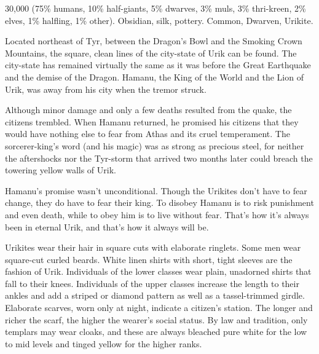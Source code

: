 {30,000 (75\% humans, 10\% half-giants, 5\% dwarves, 3\% muls, 3\% thri-kreen, 2\% elves, 1\% halfling, 1\% other).}
{Obsidian, silk, pottery.}
{Common, Dwarven, Urikite.}
{
	Located northeast of Tyr, between the Dragon's Bowl and the Smoking Crown Mountains, the square, clean lines of the city-state of Urik can be found. The city-state has remained virtually the same as it was before the Great Earthquake and the demise of the Dragon. Hamanu, the King of the World and the Lion of Urik, was away from his city when the tremor struck.

	Although minor damage and only a few deaths resulted from the quake, the citizens trembled. When Hamanu returned, he promised his citizens that they would have nothing else to fear from Athas and its cruel temperament. The sorcerer-king's word (and his magic) was as strong as precious steel, for neither the aftershocks nor the Tyr-storm that arrived two months later could breach the towering yellow walls of Urik.

	Hamanu's promise wasn't unconditional. Though the Urikites don't have to fear change, they do have to fear their king. To disobey Hamanu is to risk punishment and even death, while to obey him is to live without fear. That's how it's always been in eternal Urik, and that's how it always will be.

	Urikites wear their hair in square cuts with elaborate ringlets. Some men wear square-cut curled beards. White linen shirts with short, tight sleeves are the fashion of Urik. Individuals of the lower classes wear plain, unadorned shirts that fall to their knees. Individuals of the upper classes increase the length to their ankles and add a striped or diamond pattern as well as a tassel-trimmed girdle. Elaborate scarves, worn only at night, indicate a citizen's station. The longer and richer the scarf, the higher the wearer's social status. By law and tradition, only templars may wear cloaks, and these are always bleached pure white for the low to mid levels and tinged yellow for the higher ranks.
}
